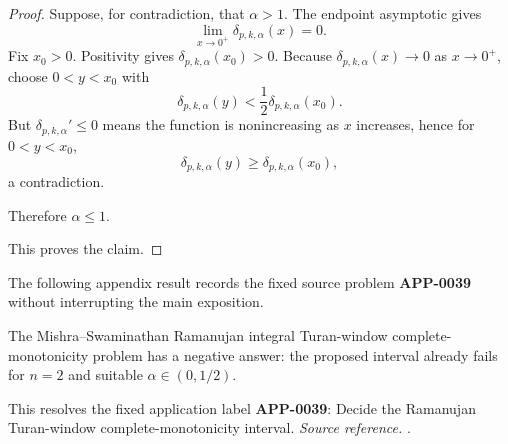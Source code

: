 \begin{proof}
Suppose, for contradiction, that \(\alpha>1\). The endpoint asymptotic gives
\[
\lim_{x\to0^+}\delta_{p,k,\alpha}(x)=0.
\]
Fix \(x_0>0\). Positivity gives \(\delta_{p,k,\alpha}(x_0)>0\). Because \(\delta_{p,k,\alpha}(x)\to0\) as \(x\to0^+\), choose \(0<y<x_0\) with
\[
\delta_{p,k,\alpha}(y)<\frac12\delta_{p,k,\alpha}(x_0).
\]
But \(\delta_{p,k,\alpha}'\le0\) means the function is nonincreasing as \(x\) increases, hence for \(0<y<x_0\),
\[
\delta_{p,k,\alpha}(y)\ge\delta_{p,k,\alpha}(x_0),
\]
a contradiction.

Therefore \(\alpha\le1\).

This proves the claim.
\end{proof}

The following appendix result records the fixed source problem \textbf{APP-0039} without interrupting the main exposition.
\begin{counterexample}
\label{res:ramanujan-turan-window-negative-answer}
The Mishra--Swaminathan Ramanujan integral Turan-window complete-monotonicity problem has a negative answer: the proposed interval already fails for \(n=2\) and suitable \(\alpha\in(0,1/2)\).

This resolves the fixed application label \textbf{APP-0039}: Decide the Ramanujan Turan-window complete-monotonicity interval.
\emph{Source reference.} \cite{app-app-0039-source}.
\end{counterexample}
